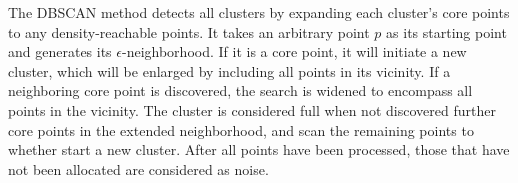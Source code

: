 \documentclass[a4paper, 12pt]{article}
\begin{document}
The DBSCAN method \citep{ester1996density, kriegel2011density} detects all clusters by expanding each cluster's core points to any density-reachable points. It takes an arbitrary point $p$ as its starting point and generates its $\epsilon$-neighborhood. If it is a core point, it will initiate a new cluster, which will be enlarged by including all points in its vicinity. If a neighboring core point is discovered, the search is widened to encompass all points in the vicinity. The cluster is considered full when not discovered further core points in the extended neighborhood, and scan the remaining points to whether start a new cluster. After all points have been processed, those that have not been allocated are considered as noise. 



\end{document}
